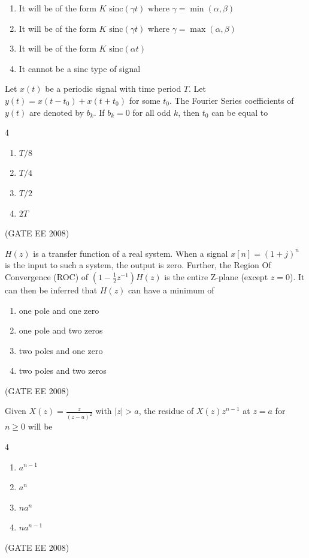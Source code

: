 \begin{enumerate}
    \item It will be of the form $K \text{ sinc}(\gamma t)$ where $\gamma=\min(\alpha, \beta)$
    \item It will be of the form $K \text{ sinc}(\gamma t)$ where $\gamma=\max(\alpha, \beta)$
    \item It will be of the form $K \text{ sinc}(\alpha t)$
    \item It cannot be a sinc type of signal
\end{enumerate}

\item Let $x(t)$ be a periodic signal with time period $T$. Let $y(t) = x(t-t_0)+x(t+t_0)$ for some $t_0$. The Fourier Series coefficients of $y(t)$ are denoted by $b_k$. If $b_k=0$ for all odd $k$, then $t_0$ can be equal to

\begin{multicols}{4}
\begin{enumerate}
    \item $T/8$
    \item $T/4$
    \item $T/2$
    \item $2T$
\end{enumerate}
\end{multicols}
\hfill (GATE EE 2008)


\item $H(z)$ is a transfer function of a real system. When a signal $x[n] = (1+j)^{n}$ is the input to such a system, the output is zero. Further, the Region Of Convergence (ROC) of $\left(1-\frac{1}{2}z^{-1}\right) H(z)$ is the entire Z-plane (except $z=0$). It can then be inferred that $H(z)$ can have a minimum of

\begin{enumerate}
    \item one pole and one zero
    \item one pole and two zeros
    \item two poles and one zero
    \item two poles and two zeros
\end{enumerate}
\hfill (GATE EE 2008)


\item Given $X(z)=\frac{z}{(z-a)^2}$ with $|z|>a$, the residue of $X(z)z^{n-1}$ at $z=a$ for $n \ge 0$ will be

\begin{multicols}{4}
\begin{enumerate}[label=(\Alph*)]
    \item $a^{n-1}$
    \item $a^{n}$
    \item $na^{n}$
    \item $na^{n-1}$
\end{enumerate}
\end{multicols}
\hfill (GATE EE 2008)


